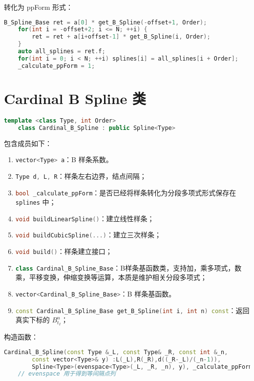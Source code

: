 \documentclass[lang=cn,a4paper,newtx,bibend=bibtex]{elegantpaper}
\newcommand{\LII}{\lstinline[language=C++]}
\begin{document}
转化为 ppForm 形式：

\begin{lstlisting}[language=C++]
    B_Spline_Base ret = a[0] * get_B_Spline(-offset+1, Order);
	for(int i = -offset+2; i <= N; ++i) {
		ret = ret + a[i+offset-1] * get_B_Spline(i, Order);
	}
	auto all_splines = ret.f;
	for(int i = 0; i < N; ++i) splines[i] = all_splines[i + Order];
	_calculate_ppForm = 1;
\end{lstlisting}

\section{Cardinal B Spline 类}

\begin{lstlisting}[language=C++]
    template <class Type, int Order>
    class Cardinal_B_Spline : public Spline<Type>
\end{lstlisting}


包含成员如下：
\begin{enumerate}
    \item \LII{vector<Type> a}：B 样条系数。
    \item \LII{Type d, L, R}：样条左右边界，结点间隔；
    \item \LII{bool _calculate_ppForm}：是否已经将样条转化为分段多项式形式保存在 \LII{splines} 中；
    \item \LII{void buildLinearSpline()}：建立线性样条；
    \item \LII{void buildCubicSpline(...)}：建立三次样条；
    \item \LII{void build()}：样条建立接口；
    \item \LII{class Cardinal_B_Spline_Base}：B样条基函数类，支持加，乘多项式，数乘，平移变换，伸缩变换等运算，本质是维护相关分段多项式；
    \item \LII{vector<Cardinal_B_Spline_Base>}：B 样条基函数。
    \item \LII{const Cardinal_B_Spline_Base get_B_Spline(int i, int n) const}：返回真实下标的 $B_{t_I}^n$；
\end{enumerate}

构造函数：

\begin{lstlisting}[language=C++]
    Cardinal_B_Spline(const Type &_L, const Type& _R, const int &_n, 
		const vector<Type>& y) :L(_L),R(_R),d((_R-_L)/(_n-1)),
		Spline<Type>(evenspace<Type>(_L, _R, _n), y), _calculate_ppForm(0), a(_n-1+Order){}
	// evenspace 用于得到等间隔点列
\end{lstlisting}
\end{document}
